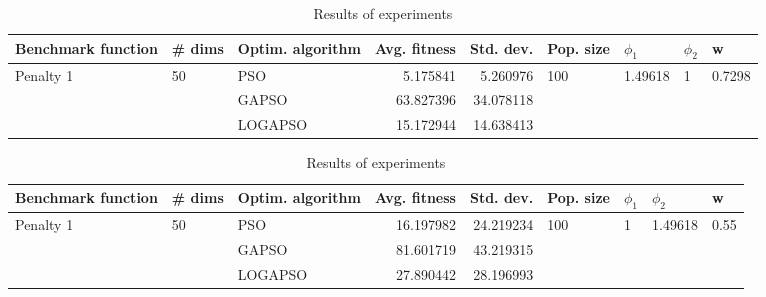 \documentclass{article}
\begin{document}
\begin{table}
\centering
\caption{Results of experiments}
\begin{tabular}{lllrrllll}
\toprule
        Benchmark function &             \# dims & Optim. algorithm &  Avg. fitness &  Std. dev. &            Pop. size &               $\phi_{1}$ &         $\phi_{2}$ &                       w \\
\midrule
\multirow{3}{*}{Penalty 1} & \multirow{3}{*}{50} &              PSO &      5.175841 &   5.260976 & \multirow{3}{*}{100} & \multirow{3}{*}{1.49618} & \multirow{3}{*}{1} & \multirow{3}{*}{0.7298} \\
                           &                     &            GAPSO &     63.827396 &  34.078118 &                      &                          &                    &                         \\
                           &                     &          LOGAPSO &     15.172944 &  14.638413 &                      &                          &                    &                         \\
\bottomrule
\end{tabular}
\end{table}
\begin{table}
\centering
\caption{Results of experiments}
\begin{tabular}{lllrrllll}
\toprule
        Benchmark function &             \# dims & Optim. algorithm &  Avg. fitness &  Std. dev. &            Pop. size &         $\phi_{1}$ &               $\phi_{2}$ &                     w \\
\midrule
\multirow{3}{*}{Penalty 1} & \multirow{3}{*}{50} &              PSO &     16.197982 &  24.219234 & \multirow{3}{*}{100} & \multirow{3}{*}{1} & \multirow{3}{*}{1.49618} & \multirow{3}{*}{0.55} \\
                           &                     &            GAPSO &     81.601719 &  43.219315 &                      &                    &                          &                       \\
                           &                     &          LOGAPSO &     27.890442 &  28.196993 &                      &                    &                          &                       \\
\bottomrule
\end{tabular}
\end{table}
\end{document}
